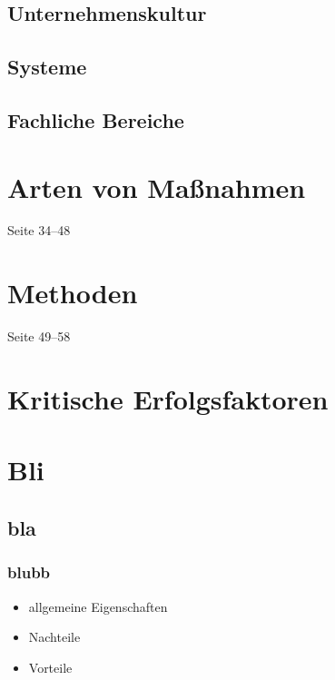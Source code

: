 \documentclass[a4paper, 12pt]{article}
\begin{document}
\subsection{Unternehmenskultur}


\subsection{Systeme}


\subsection{Fachliche Bereiche}



\section{Arten von Maßnahmen}
Seite 34--48



\section{Methoden}
Seite 49--58



\section{Kritische Erfolgsfaktoren}






\section{Bli}


\subsection{bla}

\subsubsection*{blubb}

\begin{itemize}
  \item allgemeine Eigenschaften
\end{itemize}
\begin{itemize}
  \renewcommand{\labelitemi}{\(-\)}%
  \item Nachteile
\end{itemize}
\begin{itemize}
  \renewcommand{\labelitemi}{+}%
  \item Vorteile
\end{itemize}
\end{document}
